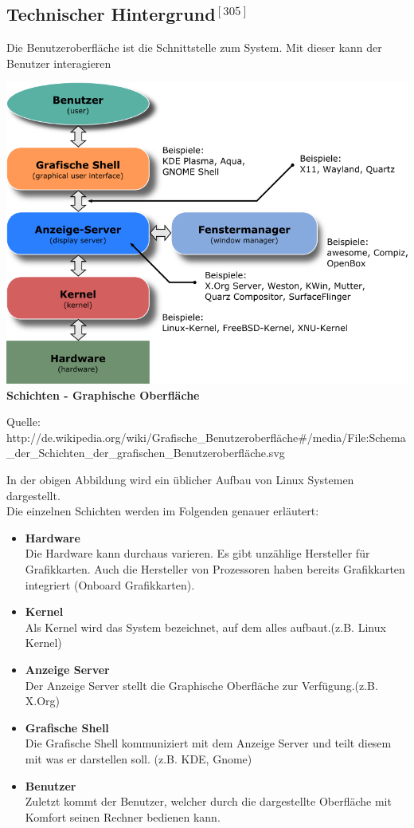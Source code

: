 \documentclass[12pt,a4paper]{report}
\begin{document}
\begin{onehalfspace}
\subsection*{Technischer Hintergrund$^{[305]}$}
Die Benutzeroberfläche ist die Schnittstelle zum System. Mit dieser kann der Benutzer interagieren
\begin{center}
\includegraphics[scale=0.7]{../docs/lyaton/graphics/Graph.png}\\
\textbf{Schichten - Graphische Oberfläche}\\
\begin{scriptsize}
Quelle: http://de.wikipedia.org/wiki/Grafische\_Benutzeroberfläche\#/media/File:Schema\_der\_Schichten\_der\_grafischen\_Benutzeroberfläche.svg
\end{scriptsize}
\end{center}
In der obigen Abbildung wird ein üblicher Aufbau von Linux Systemen dargestellt.\\
Die einzelnen Schichten werden im Folgenden genauer erläutert: \\
\begin{itemize}
\item \textbf{Hardware}\\
Die Hardware kann durchaus varieren. Es gibt unzählige Hersteller für Grafikkarten. Auch die Hersteller von Prozessoren haben bereits Grafikkarten integriert (Onboard Grafikkarten). 
\item \textbf{Kernel}\\
Als Kernel wird das System bezeichnet, auf dem alles aufbaut.(z.B. Linux Kernel)
\item \textbf{Anzeige Server}\\
Der Anzeige Server stellt die Graphische Oberfläche zur Verfügung.(z.B. X.Org)
\item \textbf{Grafische Shell}\\
Die Grafische Shell kommuniziert mit dem Anzeige Server und teilt diesem mit was er darstellen soll. (z.B. KDE, Gnome) 
\item \textbf{Benutzer}\\
Zuletzt kommt der Benutzer, welcher durch die dargestellte Oberfläche mit Komfort seinen Rechner bedienen kann. 
\end{itemize}

\end{onehalfspace}
\end{document}
